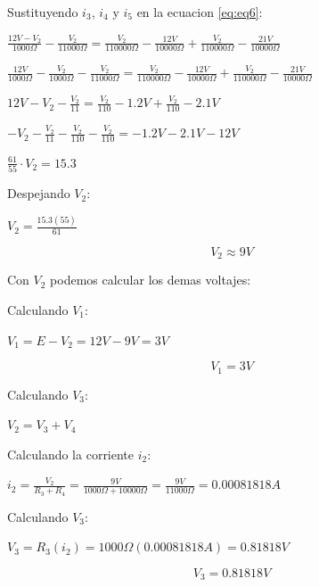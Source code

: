 \documentclass[12pt, letterpaper]{article}
\begin{document}
Sustituyendo \(i_3\), \(i_4\) y \(i_5\) en la ecuacion \ref{eq:eq6}:

\(\frac{12V - V_2}{1000 \Omega} - \frac{V_2}{11000 \Omega} = \frac{V_2}{110000 \Omega} - \frac{12V}{10000 \Omega} +\frac{V_2}{110000 \Omega} - \frac{21V}{10000 \Omega}\)

\(\frac{12V}{1000 \Omega} - \frac{V_2}{1000 \Omega} - \frac{V_2}{11000 \Omega} = \frac{V_2}{110000 \Omega} - \frac{12V}{10000 \Omega} +\frac{V_2}{110000 \Omega} - \frac{21V}{10000 \Omega}\)

\(12V - V_2 - \frac{V_2}{11} = \frac{V_2}{110} - 1.2V +\frac{V_2}{110} - 2.1V\)

\(- V_2 - \frac{V_2}{11} - \frac{V_2}{110} -\frac{V_2}{110} = - 1.2V - 2.1V - 12V \)

\(\frac{61}{55} \cdot V_2 = 15.3\)

Despejando \(V_2\):

\(V_2 = \frac{15.3(55)}{61}\)

\begin{tcolorbox}[colback=mygray, colframe=LimeGreen, boxrule=0.7pt, arc=2pt, boxsep=1pt, left=2pt, right=2pt, top=2pt, bottom=2pt, title=Resultado para \(V_2\)]
\[V_2 \approx 9 V\]
\end{tcolorbox}

Con \(V_2\) podemos calcular los demas voltajes:

Calculando \(V_1\):

\(V_1 = E - V_2 = 12V - 9V = 3V\)

\begin{tcolorbox}[colback=mygray, colframe=LimeGreen, boxrule=0.7pt, arc=2pt, boxsep=1pt, left=2pt, right=2pt, top=2pt, bottom=2pt, title=Resultado para \(V_1\)]
\[V_1 = 3 V\]
\end{tcolorbox}

Calculando \(V_3\):

\(V_2 = V_3 + V_4\)

Calculando la corriente \(i_2\):

\(i_2 = \frac{V_2}{R_3 + R_4} = \frac{9V}{1000 \Omega + 10000 \Omega} = \frac{9V}{11000 \Omega} = 0.00081818 A\)

Calculando \(V_3\):

\(V_3 = R_3(i_2) = 1000 \Omega (0.00081818 A) = 0.81818 V\)

\begin{tcolorbox}[colback=mygray, colframe=LimeGreen, boxrule=0.7pt, arc=2pt, boxsep=1pt, left=2pt, right=2pt, top=2pt, bottom=2pt, title=Resultado para \(V_3\)]
\[V_3 = 0.81818 V\]
\end{tcolorbox}
\end{document}
